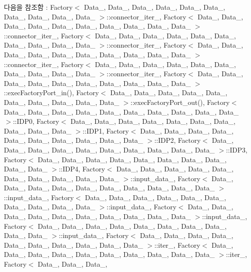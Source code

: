 다음을 참조함 \+:  Factory$<$ Data\+\_, Data\+\_, Data\+\_, Data\+\_, Data\+\_, Data\+\_, Data\+\_, Data\+\_, Data\+\_, Data\+\_ $>$\+::connector\+\_\+iter\+\_, Factory$<$ Data\+\_, Data\+\_, Data\+\_, Data\+\_, Data\+\_, Data\+\_, Data\+\_, Data\+\_, Data\+\_, Data\+\_ $>$\+::connector\+\_\+iter\+\_, Factory$<$ Data\+\_, Data\+\_, Data\+\_, Data\+\_, Data\+\_, Data\+\_, Data\+\_, Data\+\_, Data\+\_, Data\+\_ $>$\+::connector\+\_\+iter\+\_, Factory$<$ Data\+\_, Data\+\_, Data\+\_, Data\+\_, Data\+\_, Data\+\_, Data\+\_, Data\+\_, Data\+\_, Data\+\_ $>$\+::connector\+\_\+iter\+\_, Factory$<$ Data\+\_, Data\+\_, Data\+\_, Data\+\_, Data\+\_, Data\+\_, Data\+\_, Data\+\_, Data\+\_, Data\+\_ $>$\+::connector\+\_\+iter\+\_, Factory$<$ Data\+\_, Data\+\_, Data\+\_, Data\+\_, Data\+\_, Data\+\_, Data\+\_, Data\+\_, Data\+\_, Data\+\_ $>$\+::exec\+Factory\+Port\+\_\+in(), Factory$<$ Data\+\_, Data\+\_, Data\+\_, Data\+\_, Data\+\_, Data\+\_, Data\+\_, Data\+\_, Data\+\_, Data\+\_ $>$\+::exec\+Factory\+Port\+\_\+out(), Factory$<$ Data\+\_, Data\+\_, Data\+\_, Data\+\_, Data\+\_, Data\+\_, Data\+\_, Data\+\_, Data\+\_, Data\+\_ $>$\+::\+I\+D\+P0, Factory$<$ Data\+\_, Data\+\_, Data\+\_, Data\+\_, Data\+\_, Data\+\_, Data\+\_, Data\+\_, Data\+\_, Data\+\_ $>$\+::\+I\+D\+P1, Factory$<$ Data\+\_, Data\+\_, Data\+\_, Data\+\_, Data\+\_, Data\+\_, Data\+\_, Data\+\_, Data\+\_, Data\+\_ $>$\+::\+I\+D\+P2, Factory$<$ Data\+\_, Data\+\_, Data\+\_, Data\+\_, Data\+\_, Data\+\_, Data\+\_, Data\+\_, Data\+\_, Data\+\_ $>$\+::\+I\+D\+P3, Factory$<$ Data\+\_, Data\+\_, Data\+\_, Data\+\_, Data\+\_, Data\+\_, Data\+\_, Data\+\_, Data\+\_, Data\+\_ $>$\+::\+I\+D\+P4, Factory$<$ Data\+\_, Data\+\_, Data\+\_, Data\+\_, Data\+\_, Data\+\_, Data\+\_, Data\+\_, Data\+\_, Data\+\_ $>$\+::input\+\_\+data\+\_, Factory$<$ Data\+\_, Data\+\_, Data\+\_, Data\+\_, Data\+\_, Data\+\_, Data\+\_, Data\+\_, Data\+\_, Data\+\_ $>$\+::input\+\_\+data\+\_, Factory$<$ Data\+\_, Data\+\_, Data\+\_, Data\+\_, Data\+\_, Data\+\_, Data\+\_, Data\+\_, Data\+\_, Data\+\_ $>$\+::input\+\_\+data\+\_, Factory$<$ Data\+\_, Data\+\_, Data\+\_, Data\+\_, Data\+\_, Data\+\_, Data\+\_, Data\+\_, Data\+\_, Data\+\_ $>$\+::input\+\_\+data\+\_, Factory$<$ Data\+\_, Data\+\_, Data\+\_, Data\+\_, Data\+\_, Data\+\_, Data\+\_, Data\+\_, Data\+\_, Data\+\_ $>$\+::input\+\_\+data\+\_, Factory$<$ Data\+\_, Data\+\_, Data\+\_, Data\+\_, Data\+\_, Data\+\_, Data\+\_, Data\+\_, Data\+\_, Data\+\_ $>$\+::iter\+\_, Factory$<$ Data\+\_, Data\+\_, Data\+\_, Data\+\_, Data\+\_, Data\+\_, Data\+\_, Data\+\_, Data\+\_, Data\+\_ $>$\+::iter\+\_, Factory$<$ Data\+\_, Data\+\_, Data\+\_, 